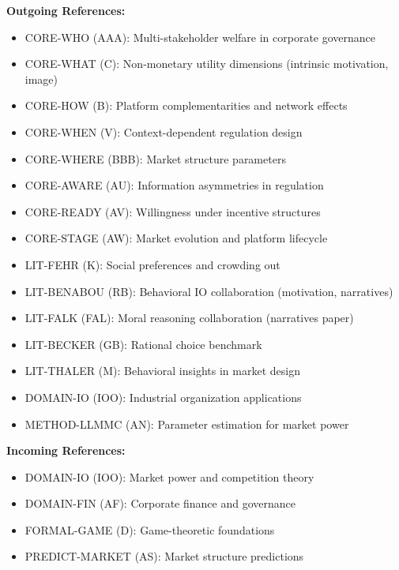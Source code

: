\begin{tcolorbox}[colback=blue!5!white,colframe=blue!75!black,title=Cross-Reference Map]
\textbf{Outgoing References:}
\begin{itemize}
    \item CORE-WHO (AAA): Multi-stakeholder welfare in corporate governance
    \item CORE-WHAT (C): Non-monetary utility dimensions (intrinsic motivation, image)
    \item CORE-HOW (B): Platform complementarities and network effects
    \item CORE-WHEN (V): Context-dependent regulation design
    \item CORE-WHERE (BBB): Market structure parameters
    \item CORE-AWARE (AU): Information asymmetries in regulation
    \item CORE-READY (AV): Willingness under incentive structures
    \item CORE-STAGE (AW): Market evolution and platform lifecycle
    \item LIT-FEHR (K): Social preferences and crowding out
    \item LIT-BENABOU (RB): Behavioral IO collaboration (motivation, narratives)
    \item LIT-FALK (FAL): Moral reasoning collaboration (narratives paper)
    \item LIT-BECKER (GB): Rational choice benchmark
    \item LIT-THALER (M): Behavioral insights in market design
    \item DOMAIN-IO (IOO): Industrial organization applications
    \item METHOD-LLMMC (AN): Parameter estimation for market power
\end{itemize}

\textbf{Incoming References:}
\begin{itemize}
    \item DOMAIN-IO (IOO): Market power and competition theory
    \item DOMAIN-FIN (AF): Corporate finance and governance
    \item FORMAL-GAME (D): Game-theoretic foundations
    \item PREDICT-MARKET (AS): Market structure predictions
\end{itemize}
\end{tcolorbox}

